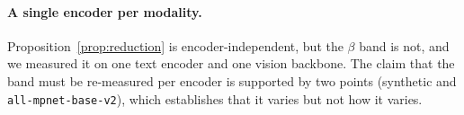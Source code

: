 \paragraph{A single encoder per modality.} Proposition~\ref{prop:reduction} is
encoder-independent, but the $\beta$ band is not, and we measured it on one text encoder and
one vision backbone. The claim that the band must be re-measured per encoder is supported by
two points (synthetic and \texttt{all-mpnet-base-v2}), which establishes that it varies but
not how it varies.
